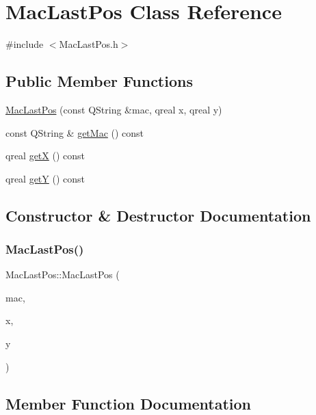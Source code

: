 \hypertarget{class_mac_last_pos}{}\section{Mac\+Last\+Pos Class Reference}
\label{class_mac_last_pos}


{\ttfamily \#include $<$Mac\+Last\+Pos.\+h$>$}

\subsection*{Public Member Functions}
\begin{DoxyCompactItemize}
\item 
\hyperlink{class_mac_last_pos_a803935167953044d9749b504d1fdd013}{Mac\+Last\+Pos} (const Q\+String \&mac, qreal x, qreal y)
\item 
const Q\+String \& \hyperlink{class_mac_last_pos_a67d9e16161bba492378fc5a5bdbb6fd1}{get\+Mac} () const
\item 
qreal \hyperlink{class_mac_last_pos_a5a537ae1bbf002320e9fbd508ac8ea4a}{getX} () const
\item 
qreal \hyperlink{class_mac_last_pos_adcb9df2aa31412ee81944255f3b48d3c}{getY} () const
\end{DoxyCompactItemize}


\subsection{Constructor \& Destructor Documentation}
\mbox{\label{class_mac_last_pos_a803935167953044d9749b504d1fdd013}} 
\subsubsection{\texorpdfstring{Mac\+Last\+Pos()}{MacLastPos()}}
{\footnotesize\ttfamily Mac\+Last\+Pos\+::\+Mac\+Last\+Pos (\begin{DoxyParamCaption}\item[{const Q\+String \&}]{mac,  }\item[{qreal}]{x,  }\item[{qreal}]{y }\end{DoxyParamCaption})}



\subsection{Member Function Documentation}
\mbox{\label{class_mac_last_pos_a67d9e16161bba492378fc5a5bdbb6fd1}} 
